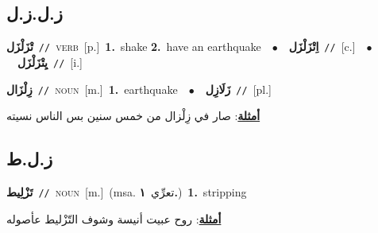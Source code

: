 \documentclass[10pt,a4paper,twoside]{article} %
\begin{document}
\begin{multicols}{2}
\vspace{-3mm}
\subsection*{\color{blue}\foreignlanguage{arabic}{ز.ل.ز.ل}\color{blue}{}} 

{\setlength\topsep{0pt}\textbf{\foreignlanguage{arabic}{تْزَلْزَل}}\ {\color{gray}\texttt{//}\color{black}}\ \textsc{verb}\ [p.]\ \textbf{1.}~shake  \textbf{2.}~have an earthquake\ \ $\bullet$\ \ \setlength\topsep{0pt}\textbf{\foreignlanguage{arabic}{اِتْزَلْزَل}}\ {\color{gray}\texttt{//}\color{black}}\ [c.]\ \ $\bullet$\ \ \setlength\topsep{0pt}\textbf{\foreignlanguage{arabic}{يِتْزَلْزَل}}\ {\color{gray}\texttt{//}\color{black}}\ [i.]\ } \vspace{2mm}

{\setlength\topsep{0pt}\textbf{\foreignlanguage{arabic}{زِلْزَال}}\ {\color{gray}\texttt{//}\color{black}}\ \textsc{noun}\ [m.]\ \textbf{1.}~earthquake\ \ $\bullet$\ \ \setlength\topsep{0pt}\textbf{\foreignlanguage{arabic}{زَلَازِل}}\ {\color{gray}\texttt{//}\color{black}}\ [pl.]\  \begin{flushright}\color{gray}\foreignlanguage{arabic}{\textbf{\underline{\foreignlanguage{arabic}{أمثلة}}}: صار في زِلْزال من خمس سنين بس الناس نسيته}\end{flushright}\color{black}} \vspace{2mm}

\vspace{-3mm}
\subsection*{\color{blue}\foreignlanguage{arabic}{ز.ل.ط}\color{blue}{}} 

{\setlength\topsep{0pt}\textbf{\foreignlanguage{arabic}{تَزْلِيط}}\ {\color{gray}\texttt{//}\color{black}}\ \textsc{noun}\ [m.]\ \color{gray}(msa. \foreignlanguage{arabic}{تعرِّي}~\foreignlanguage{arabic}{\textbf{١.}})\color{black}\ \textbf{1.}~stripping\  \begin{flushright}\color{gray}\foreignlanguage{arabic}{\textbf{\underline{\foreignlanguage{arabic}{أمثلة}}}: روح عبيت أنيسة وشوف التّزْليط عأصوله}\end{flushright}\color{black}} \vspace{2mm}


\end{multicols}
\end{document}
